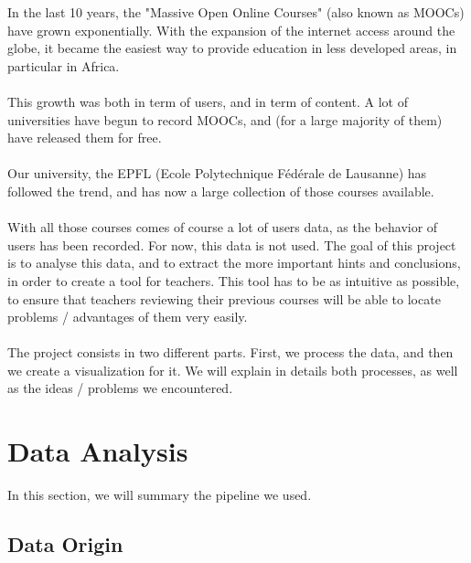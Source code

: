 \documentclass[11pt,a4paper]{article}
\begin{document}
In the last 10 years, the "Massive Open Online Courses" (also known as MOOCs) have grown exponentially. With the expansion of the internet access around the globe, it became the easiest way to provide education in less developed areas, in particular in Africa. \\
\\
This growth was both in term of users, and in term of content. A lot of universities have begun to record MOOCs, and (for a large majority of them) have released them for free. \\
\\
Our university, the EPFL (Ecole Polytechnique Fédérale de Lausanne) has followed the trend, and has now a large collection of those courses available. \\
\\
With all those courses comes of course a lot of users data, as the behavior of users has been recorded. For now, this data is not used. The goal of this project is to analyse this data, and to extract the more important hints and conclusions, in order to create a tool for teachers. This tool has to be as intuitive as possible, to ensure that teachers reviewing their previous courses will be able to locate problems / advantages of them very easily. \\
\\
The project consists in two different parts. First, we process the data, and then we create a visualization for it. We will explain in details both processes, as well as the ideas / problems we encountered.

\section{Data Analysis} \label{data_analysis}

In this section, we will summary the pipeline we used. 

\subsection{Data Origin}
\end{document}

